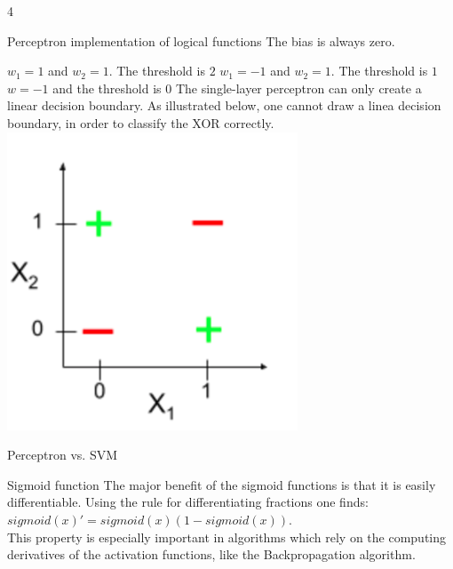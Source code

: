 \documentclass{article}
\begin{document}
    \begin{ukon-infie}[22.11.17]{4}

        \begin{exercise}[p=11]{Perceptron implementation of logical functions}
        The bias is always zero.
        
        	\question{}
        	{ $w_1 = 1$ and $w_2 = 1$. The threshold is $2$}
        	\question{}
        	{$w_1 = -1$ and $w_2 = 1$. The threshold is $1$}
        	\question{}
        	{$w = -1$ and the threshold is $0$}
        	\question{}
        	{
        	The single-layer perceptron can only create a linear decision boundary. As illustrated below, one cannot draw a linea decision boundary, in order to classify the XOR correctly.
        	\includegraphics[scale=0.5]{perceptron_XOR}
        	}
		
		\end{exercise}
		
		\begin{exercise}[p=4]{Perceptron vs. SVM}
		
		
		\end{exercise}
		
		\begin{exercise}[p=2]{Sigmoid function}
			The major benefit of the sigmoid functions is that it is easily differentiable. Using the rule for differentiating fractions one finds:\\
			$sigmoid(x)' = sigmoid(x)(1- sigmoid(x))$.\\
			This property is especially important in algorithms which rely on the computing derivatives of the activation functions, like the Backpropagation algorithm.
		\end{exercise}
		

\end{ukon-infie}
\end{document}
